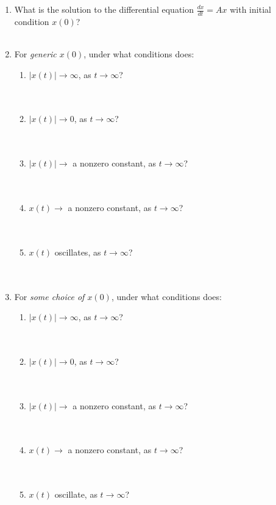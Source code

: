 \documentclass[11pt]{article}
\begin{document}
\begin{enumerate}

\item What is the solution to the differential equation $\frac{dx}{dt} = A x$ with initial condition $x(0)$? \\ \\

\item For \emph{generic $x(0)$}, under what conditions does:
\begin{enumerate}
\item $|x(t)| \to \infty$, as $t \to \infty$? \\ \\ \\
\item $|x(t)| \to 0$, as $t \to \infty$? \\ \\ \\
\item $|x(t)| \to$ a nonzero constant, as $t \to \infty$? \\ \\ \\
\item $x(t) \to$ a nonzero constant, as $t \to \infty$? \\ \\ \\
\item $x(t)$ oscillates, as $t \to \infty$? \\ \\ \\
\end{enumerate}

\item For \emph{some choice of $x(0)$}, under what conditions does:
\begin{enumerate}
\item $|x(t)| \to \infty$, as $t \to \infty$? \\ \\ \\
\item $|x(t)| \to 0$, as $t \to \infty$? \\ \\ \\
\item $|x(t)| \to$ a nonzero constant, as $t \to \infty$? \\ \\ \\
\item $x(t) \to$ a nonzero constant, as $t \to \infty$? \\ \\ \\
\item $x(t)$ oscillate, as $t \to \infty$? \\ \\ \\
\end{enumerate}


\end{enumerate}
\end{document}

